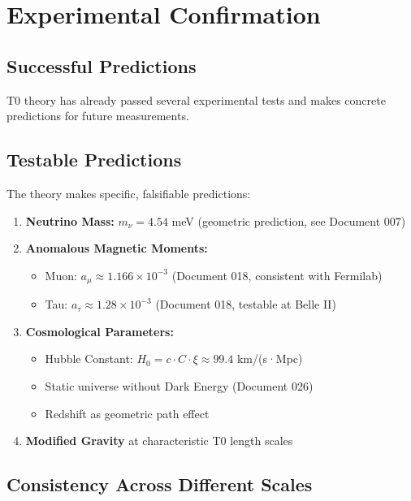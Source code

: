 	\section{Experimental Confirmation}
	
	\subsection{Successful Predictions}
	
	T0 theory has already passed several experimental tests and makes concrete predictions for future measurements.
	
	\subsection{Testable Predictions}
	
	\begin{keyresult}
		The theory makes specific, falsifiable predictions:
		\begin{enumerate}
			\item \textbf{Neutrino Mass:} $m_\nu = 4.54$ meV (geometric prediction, see Document 007)
			
			\item \textbf{Anomalous Magnetic Moments:}
			\begin{itemize}
				\item Muon: $a_\mu \approx 1.166 \times 10^{-3}$ (Document 018, consistent with Fermilab)
				\item Tau: $a_\tau \approx 1.28 \times 10^{-3}$ (Document 018, testable at Belle II)
			\end{itemize}
			
			\item \textbf{Cosmological Parameters:}
			\begin{itemize}
				\item Hubble Constant: $H_0 = c \cdot C \cdot \xi \approx 99.4$ km/(s·Mpc)
				\item Static universe without Dark Energy (Document 026)
				\item Redshift as geometric path effect
			\end{itemize}
			
			\item \textbf{Modified Gravity} at characteristic T0 length scales
		\end{enumerate}
	\end{keyresult}
	
	\subsection{Consistency Across Different Scales}
	
